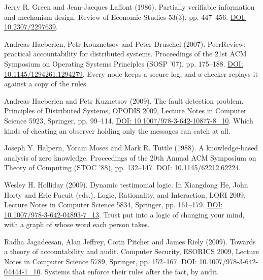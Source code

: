 \noindent Jerry R. Green and Jean-Jacques Laffont (1986). Partially verifiable information and mechanism design. Review of Economic Studies 53(3), pp. 447--456. \href{https://doi.org/10.2307/2297639}{DOI: 10.2307/2297639}.
\par\medskip

\noindent Andreas Haeberlen, Petr Kouznetsov and Peter Druschel (2007). PeerReview: practical accountability for distributed systems. Proceedings of the 21st ACM Symposium on Operating Systems Principles (SOSP '07), pp. 175--188. \href{https://doi.org/10.1145/1294261.1294279}{DOI: 10.1145/1294261.1294279}. Every node keeps a secure log, and a checker replays it against a copy of the rules.
\par\medskip

\noindent Andreas Haeberlen and Petr Kuznetsov (2009). The fault detection problem. Principles of Distributed Systems, OPODIS 2009, Lecture Notes in Computer Science 5923, Springer, pp. 99--114. \href{https://doi.org/10.1007/978-3-642-10877-8_10}{DOI: 10.1007/978-3-642-10877-8\_10}. Which kinds of cheating an observer holding only the messages can catch at all.
\par\medskip

\noindent Joseph Y. Halpern, Yoram Moses and Mark R. Tuttle (1988). A knowledge-based analysis of zero knowledge. Proceedings of the 20th Annual ACM Symposium on Theory of Computing (STOC '88), pp. 132--147. \href{https://doi.org/10.1145/62212.62224}{DOI: 10.1145/62212.62224}.
\par\medskip

\noindent Wesley H. Holliday (2009). Dynamic testimonial logic. In Xiangdong He, John Horty and Eric Pacuit (eds.), Logic, Rationality, and Interaction, LORI 2009, Lecture Notes in Computer Science 5834, Springer, pp. 161--179. \href{https://doi.org/10.1007/978-3-642-04893-7_13}{DOI: 10.1007/978-3-642-04893-7\_13}. Trust put into a logic of changing your mind, with a graph of whose word each person takes.
\par\medskip

\noindent Radha Jagadeesan, Alan Jeffrey, Corin Pitcher and James Riely (2009). Towards a theory of accountability and audit. Computer Security, ESORICS 2009, Lecture Notes in Computer Science 5789, Springer, pp. 152--167. \href{https://doi.org/10.1007/978-3-642-04444-1_10}{DOI: 10.1007/978-3-642-04444-1\_10}. Systems that enforce their rules after the fact, by audit.
\par\medskip

